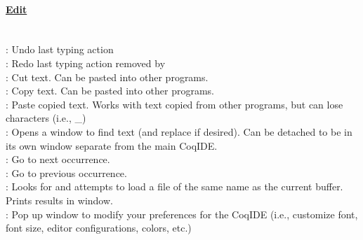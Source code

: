 \paragraph{\underline{Edit}}
~\\
 : Undo last typing action
\\
 : Redo last typing action removed by 
\\
 : Cut text. Can be pasted into other programs. 
\\
 : Copy text. Can be pasted into other programs.
\\ 
 : Paste copied text. Works with text copied from other programs, but can lose characters (i.e., \_)
\\
 : Opens a window to find text (and replace if desired). 
	Can be detached to be in its own window separate from the main CoqIDE. 
\\
 : Go to next occurrence.  %
\\
 : Go to previous occurrence.  %
\\
 : Looks for and attempts to load a  file of the same name as the current buffer. 
	Prints results in  window. 
\\
 : Pop up window to modify your preferences for the CoqIDE 
(i.e., customize font, font size, editor configurations, colors, etc.)





~\\
